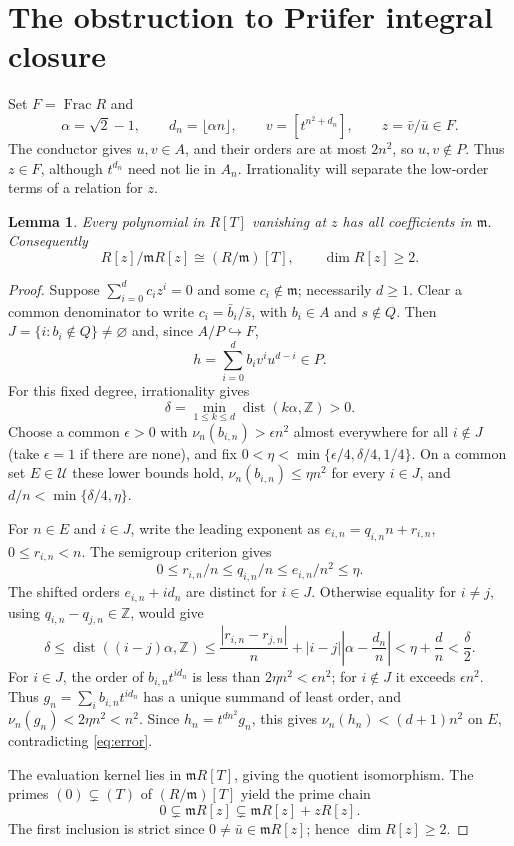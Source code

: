 \documentclass[11pt,reqno]{amsart}
\numberwithin{equation}{section}
\theoremstyle{plain}
\newtheorem{lemma}[theorem]{Lemma}
\DeclareMathOperator{\Frac}{Frac}
\DeclareMathOperator{\dist}{dist}
\newcommand{\UU}{\mathcal U}
\newcommand{\mm}{\mathfrak m}
\begin{document}
\section{The obstruction to Pr\"ufer integral closure}\label{sec:obstruction}

Set $F=\Frac R$ and
\[
 \alpha=\sqrt2-1,\qquad d_n=\lfloor\alpha n\rfloor,\qquad
 v=[t^{n^2+d_n}],\qquad z=\bar v/\bar u\in F.
\]
The conductor gives $u,v\in A$, and their orders are at most $2n^2$,
so $u,v\notin P$. Thus $z\in F$, although $t^{d_n}$ need not lie in
$A_n$. Irrationality will separate the low-order terms of a relation
for $z$.

\begin{lemma}\label{lem:separation}
Every polynomial in $R[T]$ vanishing at $z$ has all coefficients in
$\mm$. Consequently
\[
 R[z]/\mm R[z]\cong(R/\mm)[T],\qquad \dim R[z]\geq2.
\]
\end{lemma}
\begin{proof}
Suppose $\sum_{i=0}^d c_i z^i=0$ and some $c_i\notin\mm$;
necessarily $d\geq1$. Clear a common denominator to write
$c_i=\bar b_i/\bar s$, with $b_i\in A$ and $s\notin Q$.
Then $J=\{i:b_i\notin Q\}\ne\varnothing$ and, since
$A/P\hookrightarrow F$,
\begin{equation}\label{eq:error}
 h=\sum_{i=0}^d b_i v^i u^{d-i}\in P.
\end{equation}
For this fixed degree, irrationality gives
\[
 \delta=\min_{1\leq k\leq d}\dist(k\alpha,\mathbb Z)>0.
\]
Choose a common $\epsilon>0$ with
$\nu_n(b_{i,n})>\epsilon n^2$ almost everywhere for all $i\notin J$
(take $\epsilon=1$ if there are none), and fix
$0<\eta<\min\{\epsilon/4,\delta/4,1/4\}$.
On a common set $E\in\UU$ these lower bounds hold,
$\nu_n(b_{i,n})\leq\eta n^2$ for every $i\in J$, and
$d/n<\min\{\delta/4,\eta\}$.

For $n\in E$ and $i\in J$, write the leading exponent as
$e_{i,n}=q_{i,n}n+r_{i,n}$, $0\leq r_{i,n}<n$.
The semigroup criterion gives
\[
 0\leq r_{i,n}/n\leq q_{i,n}/n\leq e_{i,n}/n^2\leq\eta.
\]
The shifted orders $e_{i,n}+id_n$ are distinct for $i\in J$.
Otherwise equality for $i\ne j$, using
$q_{i,n}-q_{j,n}\in\mathbb Z$, would give
\[
 \delta\leq\dist((i-j)\alpha,\mathbb Z)
 \leq\frac{|r_{i,n}-r_{j,n}|}{n}
      +|i-j|\left|\alpha-\frac{d_n}{n}\right|
 <\eta+\frac dn<\frac\delta2.
\]
For $i\in J$, the order of $b_{i,n}t^{id_n}$ is less than
$2\eta n^2<\epsilon n^2$; for $i\notin J$ it exceeds
$\epsilon n^2$. Thus $g_n=\sum_i b_{i,n}t^{id_n}$ has a unique
summand of least order, and $\nu_n(g_n)<2\eta n^2<n^2$.
Since $h_n=t^{dn^2}g_n$, this gives
$\nu_n(h_n)<(d+1)n^2$ on $E$, contradicting \eqref{eq:error}.

The evaluation kernel lies in $\mm R[T]$, giving the quotient
isomorphism. The primes $(0)\subsetneq(T)$ of $(R/\mm)[T]$ yield
the prime chain
\[
 0\subsetneq\mm R[z]\subsetneq\mm R[z]+zR[z].
\]
The first inclusion is strict since $0\ne\bar u\in\mm R[z]$;
hence $\dim R[z]\geq2$.
\end{proof}
\end{document}
